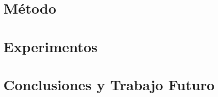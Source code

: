 \documentclass[a4paper,	11pt]{report}
\begin{document}
\chapter{Método}
\label{sec:method}


\chapter{Experimentos}
\label{sec:experiments}


\chapter{Conclusiones y Trabajo Futuro}
\label{sec:conclusions}


\appendix
\label{sec:appendix}


\nocite{*}


\begin{small}

\end{small}
\end{document}
